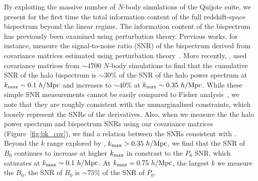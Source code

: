 By exploiting the massive number of $N$-body simulations of the Quijote 
suite, we present for the first time the total information content of the 
full redshift-space bispectrum beyond the linear regime. The information content 
of the bispectrum has previously been examined using perturbation 
theory. Previous works, for instance, measure the signal-to-noise ratio (SNR) 
of the bispectrum derived from covariance matrices estimated using perturbation 
theory~\citep{sefusatti2005, sefusatti2006, chan2017}. More recently, \cite{chan2017},
used covariance matrices from %
$\sim 4700$ $N$-body simulations to find that the cumulative SNR of the halo bispectrum is 
$\sim 30\%$ of the SNR of the halo power spectrum at $k_{\rm max} \sim 0.1~h/{\rm Mpc}$ 
and increases to $\sim 40\%$ at $k_{\rm max}\sim 0.35~h/{\rm Mpc}$. While these simple 
SNR measurements cannot be easily compared to Fisher analysis~\citep{repp2015, blot2016}, 
we note that they are roughly consistent with the unmarginalized constraints, 
which loosely represent the SNRs of the derivatives. 
Also, when we measure the the halo power spectrum and bispectrum SNRs using our 
covariance matrices (Figure~\ref{fig:bk_cov}), we find a relation between the 
SNRs consistent with \cite{chan2017}. Beyond the $k$ range explored by \cite{chan2017},  
$k_{\rm max}>0.35~h/{\rm Mpc}$, we find that the SNR of $B_0$ continues to increase 
at higher $k_{\rm max}$ in constrast to the $P_0$ SNR, which saturates at 
$k_{\rm max}\sim 0.1~h/{\rm Mpc}$. At $k_{\rm max} = 0.75~h/{\rm Mpc}$, the largest $k$ we 
measure the $B_0$, the SNR of $B_0$ is $\sim75\%$ of the SNR of $P_0$.

